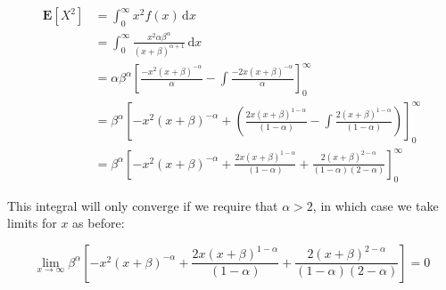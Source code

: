 \documentclass{article}
\begin{document}
\begin{align*}
  \mathbf{E}\left[X^2\right] &= \int_0^{\infty}
                               x^2 f(x) \, \mathrm{d}x \\
                             &= \int_0^{\infty}
                               \frac{x^2 \alpha \beta^\alpha}
                               {{\left( x + \beta \right)}^{\alpha +
                               1}} \, \mathrm{d}x \\
                             &= \alpha \beta^\alpha
                               {\left[
                               \frac{-x^2
                               {\left( x + \beta \right)}^{- \alpha}}
                               {\alpha}
                               - \int \frac{-2x{(x + \beta)}^{- \alpha}}
                               {\alpha}
                               \right]}_0^{\infty} \\
                             &= \beta^\alpha
                               {\left[
                               -x^2 {(x + \beta)}^{-\alpha}
                               + \left(
                               \frac{2x{\left(x + \beta \right)}^{1 - \alpha}}
                               {(1 - \alpha)}
                               - \int \frac{2{\left( x + \beta
                               \right)}^{1 - \alpha}}
                               {(1 - \alpha)}
                               \right)
                               \right]}_0^{\infty} \\
                             &= \beta^\alpha
                               {\left[
                               -x^2 {(x + \beta)}^{-\alpha}
                               + \frac{2x{\left(x + \beta \right)}^{1 - \alpha}}
                                 {(1 - \alpha)}
                               + \frac{2 {\left(x + \beta \right)}^{2 - \alpha}}
                                 {(1 - \alpha)(2 - \alpha)}
                               \right]}_0^{\infty}
\end{align*}

This integral will only converge if we require that $\alpha > 2$, in
which case we take limits for $x$ as before:

\begin{displaymath}
\lim_{x \to \infty}
\beta^\alpha
  {\left[
  -x^2 {(x + \beta)}^{-\alpha}
  + \frac{2x{\left(x + \beta \right)}^{1 - \alpha}}
  {(1 - \alpha)}
  + \frac{2 {\left(x + \beta \right)}^{2 - \alpha}}
  {(1 - \alpha)(2 - \alpha)}
  \right]}
= 0
\end{displaymath}
\end{document}
